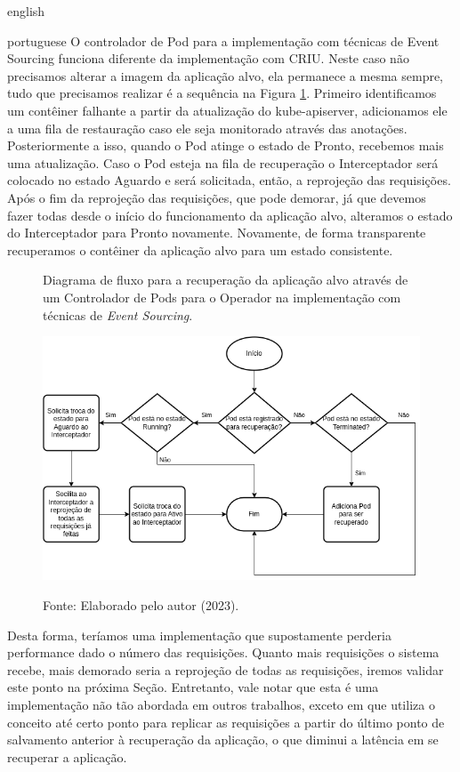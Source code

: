 \begin{otherlanguage*}{english}
\begin{otherlanguage*}{portuguese}
O controlador de Pod para a implementação com técnicas de Event Sourcing funciona
diferente da implementação com CRIU. Neste caso não precisamos alterar a imagem da
aplicação alvo, ela permanece a mesma sempre, tudo que precisamos realizar é a sequência
na Figura \ref{fig:pod-controller-event-sourcing}. Primeiro identificamos um contêiner
falhante a partir da atualização do kube-apiserver, adicionamos ele a uma fila de
restauração caso ele seja monitorado através das anotações. Posteriormente a isso, quando
o Pod atinge o estado de Pronto, recebemos mais uma atualização. Caso o Pod esteja na
fila de recuperação o Interceptador será colocado no estado Aguardo e será solicitada, então, a
reprojeção das requisições. Após o fim da reprojeção das requisições, que pode demorar,
já que devemos fazer todas desde o início do funcionamento da aplicação alvo, alteramos
o estado do Interceptador para Pronto novamente. Novamente, de forma transparente
recuperamos o contêiner da aplicação alvo para um estado consistente.

\begin{figure}[h]
\centering
\caption{Diagrama de fluxo para a recuperação da aplicação alvo através de um Controlador de Pods para o Operador na implementação com técnicas de \textit{Event Sourcing}.}
\includegraphics[scale=0.64]{images/restore-pod.png}
\label{fig:pod-controller-event-sourcing}
\caption*{Fonte: Elaborado pelo autor (2023).}
\end{figure}

Desta forma, teríamos uma implementação que supostamente perderia performance dado
o número das requisições. Quanto mais requisições o sistema recebe, mais demorado seria
a reprojeção de todas as requisições, iremos validar este ponto na próxima Seção.
Entretanto, vale notar que esta é uma implementação não tão abordada em outros trabalhos,
exceto em \cite{muller2022architecture} que utiliza o conceito até certo ponto para
replicar as requisições a partir do último ponto de salvamento anterior à recuperação
da aplicação, o que diminui a latência em se recuperar a aplicação.


\end{otherlanguage*}
\end{otherlanguage*}
